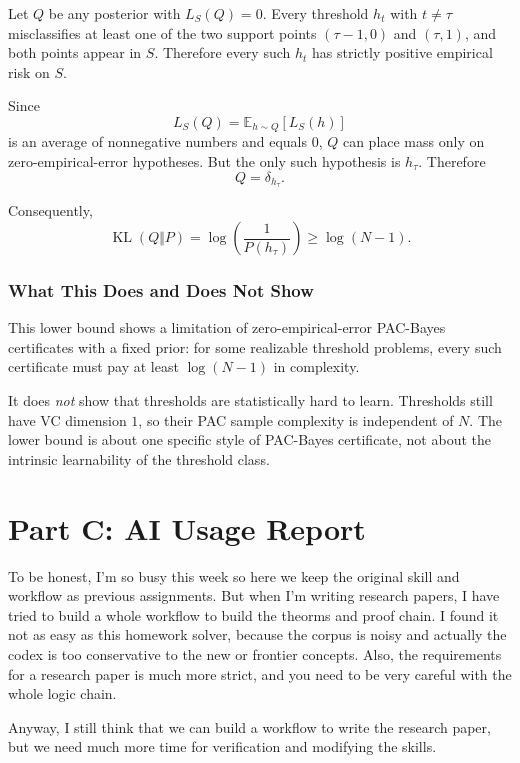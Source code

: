 \documentclass{article}
\DeclareMathOperator{\KL}{KL}
\newcommand{\EE}{\mathbb{E}}
\begin{document}
Let $Q$ be any posterior with $L_S(Q)=0$. Every threshold $h_t$ with $t\ne\tau$ misclassifies at least one of the two support points $(\tau-1,0)$ and $(\tau,1)$, and both points appear in $S$. Therefore every such $h_t$ has strictly positive empirical risk on $S$.

Since
$$
L_S(Q)=\EE_{h\sim Q}[L_S(h)]
$$
is an average of nonnegative numbers and equals $0$, $Q$ can place mass only on zero-empirical-error hypotheses. But the only such hypothesis is $h_\tau$. Therefore
$$
Q=\delta_{h_\tau}.
$$

Consequently,
$$
\KL(Q\Vert P)
=
\log\!\left(\frac{1}{P(h_\tau)}\right)
\ge
\log(N-1).
$$

\subsubsection{What This Does and Does Not Show}

This lower bound shows a limitation of zero-empirical-error PAC-Bayes certificates with a fixed prior: for some realizable threshold problems, every such certificate must pay at least $\log(N-1)$ in complexity.

It does \emph{not} show that thresholds are statistically hard to learn. Thresholds still have VC dimension $1$, so their PAC sample complexity is independent of $N$. The lower bound is about one specific style of PAC-Bayes certificate, not about the intrinsic learnability of the threshold class.

\newpage
\section{Part C: AI Usage Report}

To be honest, I'm so busy this week so here we keep the original skill and workflow as previous assignments.
But when I'm writing research papers, I have tried to build a whole workflow to build the theorms and proof chain.
I found it not as easy as this homework solver, because the corpus is noisy and actually the codex is too conservative to the new
or frontier concepts. Also, the requirements for a research paper is much more strict, and you need to be very careful with the whole logic chain.

Anyway, I still think that we can build a workflow to write the research paper, but we need much more time for verification and modifying the skills.
\end{document}
